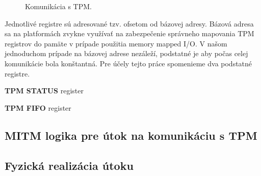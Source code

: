 \begin{figure}
    \centering
    \vfill
    \caption[Komunikácia s TPM]{Komunikácia s TPM.}
    \label{obr:tpmRW}
\end{figure}

Jednotlivé registre sú adresované tzv. ofsetom od bázovej adresy. Bázová adresa sa na platformách zvykne využívať na zabezpečenie správneho mapovania TPM registrov do pamäte v prípade použitia memory mapped I/O. V našom jednoduchom prípade na bázovej adrese nezáleží, podstatné je aby počas celej komunikácie bola konštantná. Pre účely tejto práce spomenieme dva podstatné registre.

\textbf{TPM STATUS} register

\textbf{TPM FIFO} register

\subsection{MITM logika pre útok na komunikáciu s TPM}

\subsection{Fyzická realizácia útoku}